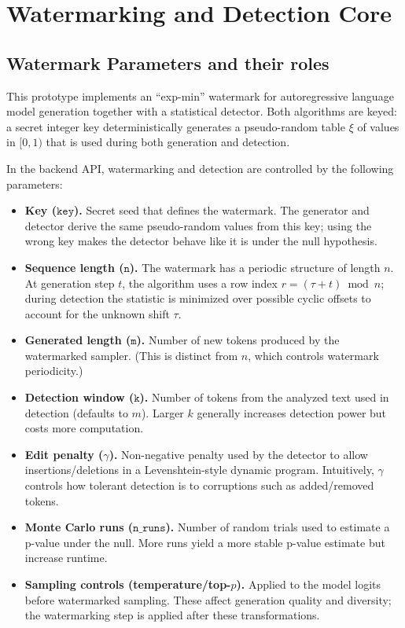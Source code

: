 
\section{Watermarking and Detection Core}
\subsection{Watermark Parameters and their roles}
This prototype implements an ``exp-min'' watermark for autoregressive language model generation together with a statistical detector. Both algorithms are keyed: a secret integer key deterministically generates a pseudo-random table $\xi$ of values in $[0,1)$ that is used during both generation and detection.

In the backend API, watermarking and detection are controlled by the following parameters:
\begin{itemize}
    \item \textbf{Key ($\mathtt{key}$).} Secret seed that defines the watermark. The generator and detector derive the same pseudo-random values from this key; using the wrong key makes the detector behave like it is under the null hypothesis.
    \item \textbf{Sequence length ($\mathtt{n}$).} The watermark has a periodic structure of length $n$. At generation step $t$, the algorithm uses a row index $r=(\tau+t)\bmod n$; during detection the statistic is minimized over possible cyclic offsets to account for the unknown shift $\tau$.
    \item \textbf{Generated length ($\mathtt{m}$).} Number of new tokens produced by the watermarked sampler. (This is distinct from $n$, which controls watermark periodicity.)
    \item \textbf{Detection window ($\mathtt{k}$).} Number of tokens from the analyzed text used in detection (defaults to $m$). Larger $k$ generally increases detection power but costs more computation.
    \item \textbf{Edit penalty ($\gamma$).} Non-negative penalty used by the detector to allow insertions/deletions in a Levenshtein-style dynamic program. Intuitively, $\gamma$ controls how tolerant detection is to corruptions such as added/removed tokens.
    \item \textbf{Monte Carlo runs ($\mathtt{n\_runs}$).} Number of random trials used to estimate a p-value under the null. More runs yield a more stable p-value estimate but increase runtime.
    \item \textbf{Sampling controls (temperature/top-$p$).} Applied to the model logits before watermarked sampling. These affect generation quality and diversity; the watermarking step is applied after these transformations.
\end{itemize}

